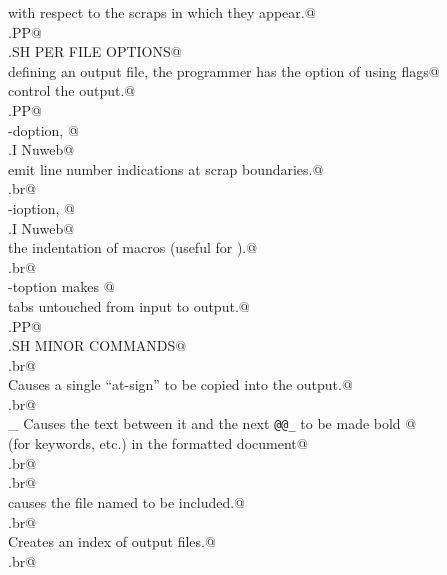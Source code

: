 \documentclass{report}
\begin{document}
\begin{flushleft}
\begin{list}{}{}
\mbox{}\verb@scraps with respect to the scraps in which they appear.@\\
\mbox{}\verb@.PP@\\
\mbox{}\verb@.SH PER FILE OPTIONS@\\
\mbox{}\verb@When defining an output file, the programmer has the option of using flags@\\
\mbox{}\verb@to control the output.@\\
\mbox{}\verb@.PP@\\
\mbox{}\verb@\fB-d\fR option, @\\
\mbox{}\verb@.I Nuweb@\\
\mbox{}\verb@will emit line number indications at scrap boundaries.@\\
\mbox{}\verb@.br@\\
\mbox{}\verb@\fB-i\fR option, @\\
\mbox{}\verb@.I Nuweb@\\
\mbox{}\verb@supresses the indentation of macros (useful for \fBFortran\fR).@\\
\mbox{}\verb@.br@\\
\mbox{}\verb@\fB-t\fP option makes \fInuweb\fP @\\
\mbox{}\verb@copy tabs untouched from input to output.@\\
\mbox{}\verb@.PP@\\
\mbox{}\verb@.SH MINOR COMMANDS@\\
\mbox{}\verb@.br@\\
\mbox{}\verb@    Causes a single ``at-sign'' to be copied into the output.@\\
\mbox{}\verb@.br@\\
\mbox{}\verb@\_    Causes the text between it and the next {\tt @{\tt @}\verb@\_} to be made bold @\\
\mbox{}\verb@        (for keywords, etc.) in the formatted document@\\
\mbox{}\verb@.br@\\
\mbox{}\verb@%     Comments out a line so that it doesn't appear in the output.@\\
\mbox{}\verb@.br@\\
\mbox{}\verb@i     \fBfilename\fR causes the file named to be included.@\\
\mbox{}\verb@.br@\\
\mbox{}\verb@f     Creates an index of output files.@\\
\mbox{}\verb@.br@\\

\end{list}
\end{flushleft}
\end{document}
